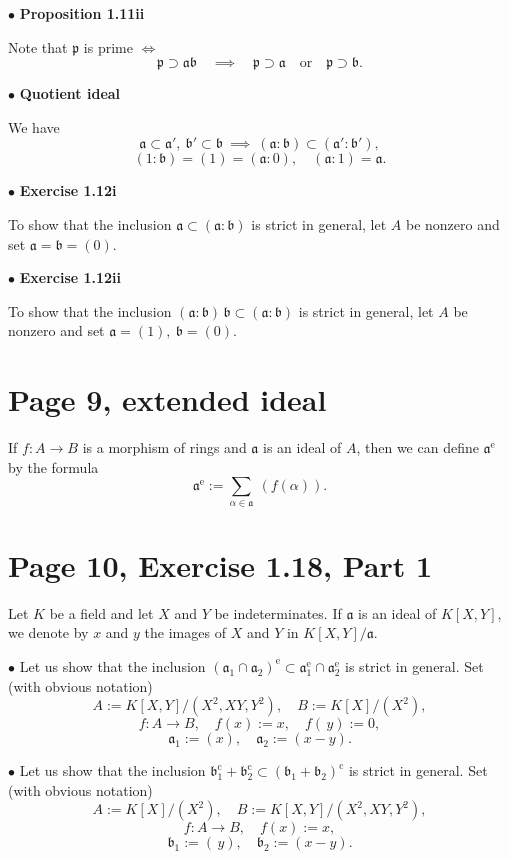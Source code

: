 \documentclass[parskip=half]{scrartcl}%
\newcommand{\oo}{\operatorname}
\newcommand{\mf}{\mathfrak}
\newcommand{\bu}{\bullet}
\begin{document}

$\bu$ \textbf{\Large Proposition 1.11ii}%

Note that $\mf p$ is prime $\iff$
$$
\mf p\supset\mf a\mf b\quad\implies\quad\mf p\supset\mf a\quad\text{or}\quad\mf p\supset\mf b.
$$

$\bu$ \textbf{\Large Quotient ideal}%

We have 
$$
\mf a\subset\mf a',\ \mf b'\subset\mf b\ \implies\ (\mf a:\mf b)\subset(\mf a':\mf b'),
$$ 
$$
(1:\mf b)=(1)=(\mf a:0),\quad(\mf a:1)=\mf a.
$$

$\bu$ \textbf{\Large Exercise 1.12i}%

To show that the inclusion $\mf a\subset(\mf a:\mf b)$ is strict in general, let $A$ be nonzero and set $\mf a=\mf b=(0)$.

$\bu$ \textbf{\Large Exercise 1.12ii}%

To show that the inclusion $(\mf a\!:\!\mf b)\,\mf b\subset(\mf a:\mf b)$ is strict in general, let $A$ be nonzero and set $\mf a=(1),\ \mf b=(0)$.

\section{Page 9, extended ideal}%

If $f:A\to B$ is a morphism of rings and $\mf a$ is an ideal of $A$, then we can define $\mf a^{\oo e}$ by the formula
$$
\mf a^{\oo e}:=\sum_{\alpha\in\mf a}\ (f(\alpha)).
$$

\section{Page 10, Exercise 1.18, Part 1}%

Let $K$ be a field and let $X$ and $Y$ be indeterminates. If $\mf a$ is an ideal of $K[X,Y]$, we denote by $x$ and $y$ the images of $X$ and $Y$ in $K[X,Y]/\mf a$.

$\bu$ Let us show that the inclusion $(\mf a_1\cap\mf a_2)^{\oo e}\subset\mf a_1^{\oo e}\cap\mf a_2^{\oo e}$ is strict in general. Set (with obvious notation) 
$$
A:=K[X,Y]/(X^2,XY,Y^2),\quad B:=K[X]/(X^2),
$$ 
$$
f:A\to B,\quad f(x):=x,\quad f(\,y):=0,
$$ 
$$
\mf a_1:=(x),\quad\mf a_2:=(x-y).
$$

$\bu$ Let us show that the inclusion $\mf b_1^{\oo c}+\mf b_2^{\oo c}\subset(\mf b_1+\mf b_2)^{\oo c}$ is strict in general. Set (with obvious notation) 
$$
A:=K[X]/(X^2),\quad B:=K[X,Y]/(X^2,XY,Y^2),
$$ 
$$
f:A\to B,\quad f(x):=x,
$$ 
$$
\mf b_1:=(\,y),\quad\mf b_2:=(x-y).
$$
\end{document}

